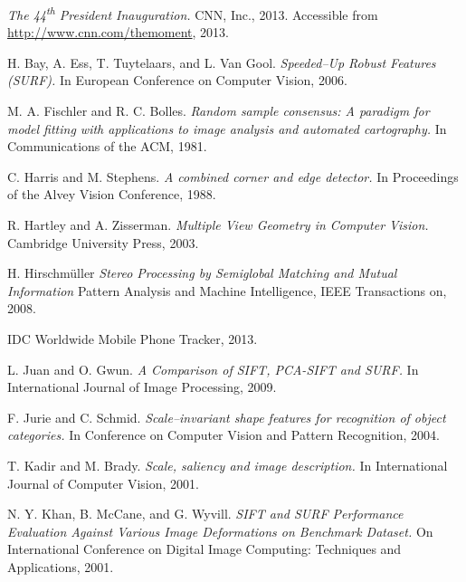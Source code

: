 
\def\bibname{Bibliography}
\begin{thebibliography}{99}
\addcontentsline{toc}{chapter}{\bibname}

  \emph{The 44\textsuperscript{th} President Inauguration.}
  CNN, Inc., 2013. Accessible from \url{http://www.cnn.com/themoment}, 2013.

  {\sc  H. Bay, A. Ess, T. Tuytelaars, and L. Van Gool.}
  \emph{Speeded–Up Robust Features (SURF).}
  In European Conference on Computer Vision, 2006.

  {\sc M. A. Fischler and R. C. Bolles.} 
  \emph{Random sample consensus: A paradigm for model fitting with applications to image analysis and automated cartography.} 
  In Communications of the ACM, 1981.

  {\sc C. Harris and M. Stephens.} 
  \emph{A combined corner and edge detector.}
  In Proceedings of the Alvey Vision Conference, 1988.

  {\sc  R. Hartley and A. Zisserman.}
  \emph{Multiple View Geometry in Computer Vision.}
  Cambridge University Press, 2003.

  {\sc  H. Hirschmüller}
  \emph{Stereo Processing by Semiglobal Matching and Mutual Information}
  Pattern Analysis and Machine Intelligence, IEEE Transactions on, 2008.

  IDC Worldwide Mobile Phone Tracker, 2013.

  {\sc L. Juan and O. Gwun.} 
  \emph{A Comparison of SIFT, PCA-SIFT and SURF.}
  In International Journal of Image Processing, 2009.

  {\sc F. Jurie and C. Schmid.} 
  \emph{Scale–invariant shape features for recognition of object categories.}
  In Conference on Computer Vision and Pattern Recognition, 2004.

  {\sc T. Kadir and M. Brady.} 
  \emph{Scale, saliency and image description.}
  In International Journal of Computer Vision, 2001.

  {\sc N. Y. Khan, B. McCane, and G. Wyvill.} 
  \emph{SIFT and SURF Performance Evaluation Against Various Image Deformations on Benchmark Dataset.}
  On International Conference on Digital Image Computing: Techniques and Applications, 2001.


\end{thebibliography}
